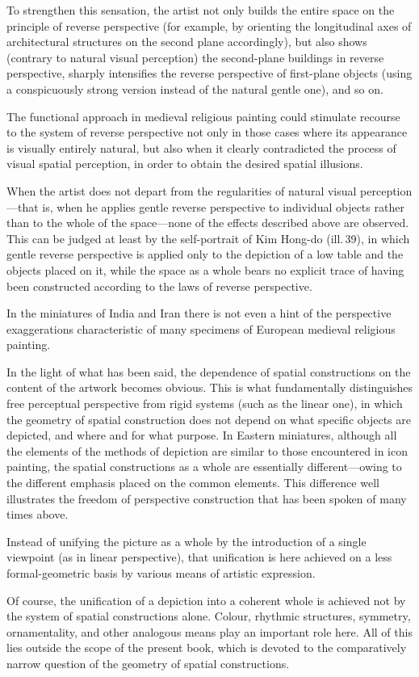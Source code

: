 To strengthen this sensation, the artist not only builds the entire space on the
principle of reverse perspective (for example, by orienting the longitudinal axes of
architectural structures on the second plane accordingly), but also shows (contrary
to natural visual perception) the second-plane buildings in reverse perspective,
sharply intensifies the reverse perspective of first-plane objects (using a
conspicuously strong version instead of the natural gentle one), and so on.

The functional approach in medieval religious painting could stimulate recourse to
the system of reverse perspective not only in those cases where its appearance is
visually entirely natural, but also when it clearly contradicted the process of
visual spatial perception, in order to obtain the desired spatial illusions.

When the artist does not depart from the regularities of natural visual
perception---that is, when he applies gentle reverse perspective to individual
objects rather than to the whole of the space---none of the effects described above
are observed. This can be judged at least by the self-portrait of Kim Hong-do
(ill.\,39), in which gentle reverse perspective is applied only to the depiction of
a low table and the objects placed on it, while the space as a whole bears no
explicit trace of having been constructed according to the laws of reverse
perspective.

In the miniatures of India and Iran there is not even a hint of the perspective
exaggerations characteristic of many specimens of European medieval religious
painting.

In the light of what has been said, the dependence of spatial constructions on the
content of the artwork becomes obvious. This is what fundamentally distinguishes
free perceptual perspective from rigid systems (such as the linear one), in which
the geometry of spatial construction does not depend on what specific objects are
depicted, and where and for what purpose. In Eastern miniatures, although all the
elements of the methods of depiction are similar to those encountered in icon
painting, the spatial constructions as a whole are essentially different---owing to
the different emphasis placed on the common elements. This difference well
illustrates the freedom of perspective construction that has been spoken of many
times above.

Instead of unifying the picture as a whole by the introduction of a single
viewpoint (as in linear perspective), that unification is here achieved on a less
formal-geometric basis by various means of artistic expression.

Of course, the unification of a depiction into a coherent whole is achieved not by
the system of spatial constructions alone. Colour, rhythmic structures, symmetry,
ornamentality, and other analogous means play an important role here. All of this
lies outside the scope of the present book, which is devoted to the comparatively
narrow question of the geometry of spatial constructions.
